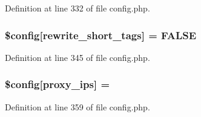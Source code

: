 Definition at line 332 of file config.\+php.

\subsubsection[{\texorpdfstring{\$config}{$config}}]{\setlength{\rightskip}{0pt plus 5cm}\$config\mbox{[}\textquotesingle{}rewrite\+\_\+short\+\_\+tags\textquotesingle{}\mbox{]} = F\+A\+L\+SE}\hypertarget{ci_2application_2config_2config_8php_a5d2e2b3f3030d1bd97f6d986ef13ace9}{}\label{ci_2application_2config_2config_8php_a5d2e2b3f3030d1bd97f6d986ef13ace9}


Definition at line 345 of file config.\+php.

\subsubsection[{\texorpdfstring{\$config}{$config}}]{\setlength{\rightskip}{0pt plus 5cm}\$config\mbox{[}\textquotesingle{}proxy\+\_\+ips\textquotesingle{}\mbox{]} = \textquotesingle{}\textquotesingle{}}\hypertarget{ci_2application_2config_2config_8php_a99ce814cf767ce4e281380e6f2158b1b}{}\label{ci_2application_2config_2config_8php_a99ce814cf767ce4e281380e6f2158b1b}


Definition at line 359 of file config.\+php.

